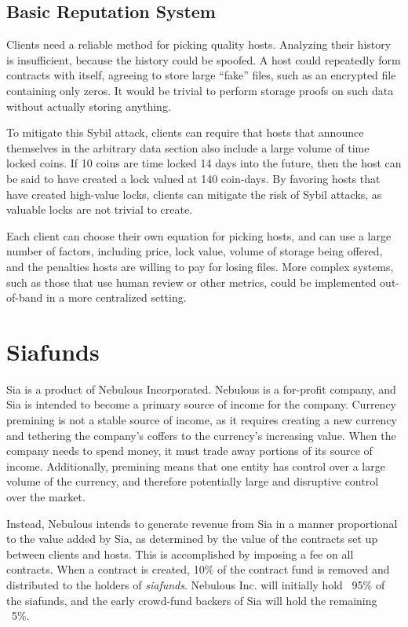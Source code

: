 \documentclass[twocolumn]{article}
\begin{document}
\subsection{Basic Reputation System}
Clients need a reliable method for picking quality hosts.
Analyzing their history is insufficient, because the history could be spoofed.
A host could repeatedly form contracts with itself, agreeing to store large ``fake'' files, such as an encrypted file containing only zeros.
It would be trivial to perform storage proofs on such data without actually storing anything.

To mitigate this Sybil attack, clients can require that hosts that announce themselves in the arbitrary data section also include a large volume of time locked coins.
If 10 coins are time locked 14 days into the future, then the host can be said to have created a lock valued at 140 coin-days.
By favoring hosts that have created high-value locks, clients can mitigate the risk of Sybil attacks, as valuable locks are not trivial to create.

Each client can choose their own equation for picking hosts, and can use a large number of factors, including price, lock value, volume of storage being offered, and the penalties hosts are willing to pay for losing files.
More complex systems, such as those that use human review or other metrics, could be implemented out-of-band in a more centralized setting.

\section{Siafunds}
Sia is a product of Nebulous Incorporated.
Nebulous is a for-profit company, and Sia is intended to become a primary source of income for the company.
Currency premining is not a stable source of income, as it requires creating a new currency and tethering the company's coffers to the currency's increasing value.
When the company needs to spend money, it must trade away portions of its source of income.
Additionally, premining means that one entity has control over a large volume of the currency, and therefore potentially large and disruptive control over the market.

Instead, Nebulous intends to generate revenue from Sia in a manner proportional to the value added by Sia, as determined by the value of the contracts set up between clients and hosts.
This is accomplished by imposing a fee on all contracts.
When a contract is created, 10\% of the contract fund is removed and distributed to the holders of \textit{siafunds}.
Nebulous Inc. will initially hold ~95\% of the siafunds, and the early crowd-fund backers of Sia will hold the remaining ~5\%.
\end{document}

